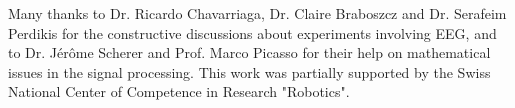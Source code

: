 \documentclass{svmult}
\begin{document}

\begin{acknowledgement}
Many thanks to Dr. Ricardo Chavarriaga, Dr. Claire Braboszcz and Dr. Serafeim Perdikis for the constructive discussions about experiments involving EEG, and to Dr. J\'er\^ome Scherer and Prof. Marco Picasso for their help on mathematical issues in the signal processing. This work was partially supported by the Swiss National Center of Competence in Research "Robotics".
\end{acknowledgement}


\end{document}
